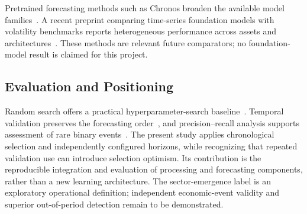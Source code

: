Pretrained forecasting methods such as Chronos broaden the available model families~\cite{ansari2024chronos}. A recent preprint comparing time-series foundation models with volatility benchmarks reports heterogeneous performance across assets and architectures~\cite{brini2026foundation}. These methods are relevant future comparators; no foundation-model result is claimed for this project.

\subsection{Evaluation and Positioning}
Random search offers a practical hyperparameter-search baseline~\cite{bergstra2012random}. Temporal validation preserves the forecasting order~\cite{hyndman2021forecasting}, and precision--recall analysis supports assessment of rare binary events~\cite{saito2015precision}. The present study applies chronological selection and independently configured horizons, while recognizing that repeated validation use can introduce selection optimism. Its contribution is the reproducible integration and evaluation of processing and forecasting components, rather than a new learning architecture. The sector-emergence label is an exploratory operational definition; independent economic-event validity and superior out-of-period detection remain to be demonstrated.
